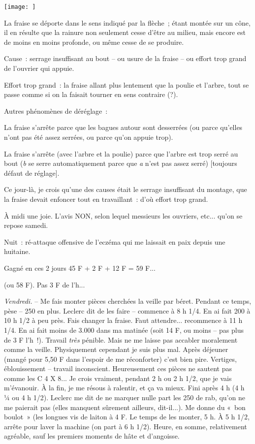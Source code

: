 \documentclass[french,twoside]{book} %
\begin{document}
\begin{center}
 \noindent\texttt{[image: ]} \end{center}
\noindent La fraise se déporte dans le sens indiqué par la flèche ; étant montée sur un cône, il en résulte que la rainure non seulement cesse d'être au milieu, mais encore est de moins en moins profonde, ou même cesse de se produire.\par
Cause : serrage insuffisant au bout – ou usure de la fraise – ou effort trop grand de l'ouvrier qui appuie.\par
Effort trop grand : la fraise allant plus lentement que la poulie et l'arbre, tout se passe comme si on la faisait tourner en sens contraire (?).\par
Autres phénomènes de déréglage :\par
La fraise s'arrête parce que les bagues autour sont desserrées (ou parce qu'elles n'ont pas été assez serrées, ou parce qu'on appuie trop).\par
La fraise s'arrête (avec l'arbre et la poulie) parce que l'arbre est trop serré au bout ({\itshape b} se serre automatiquement parce que {\itshape a} n'est pas assez serré) [toujours défaut de réglage].\par
Ce jour-là, je crois qu'une des causes était le serrage insuffisant du montage, que la fraise devait enfoncer tout en travaillant : d'où effort trop grand.\par
À midi une joie. L'avis NON, selon lequel messieurs les ouvriers, etc... qu'on se repose samedi.\par
Nuit : ré-attaque offensive de l'eczéma qui me laissait en paix depuis une huitaine.\par
Gagné en ces 2 jours 45 F + 2 F + 12 F = 59 F...\par
(ou 58 F). Pas 3 F de l'h...\par
{\itshape Vendredi.} – Me fais monter pièces cherchées la veille par béret. Pendant ce temps, pèse – 250 en plus. Leclerc dit de les faire – commence à 8 h 1/4. En ai fait 200 à 10 h 1/2 à peu près. Fais changer la fraise. Faut attendre... recommence à 11 h 1/4. En ai fait moins de 3.000 dans ma matinée (soit 14 F, ou moins – pas plus de 3 F l'h !). Travail {\itshape très} pénible. Mais ne me laisse pas accabler moralement comme la veille. Physiquement cependant je suis plus mal. Après déjeuner (mangé pour 5,50 F dans l'espoir de me réconforter) c'est bien pire. Vertiges, éblouissement – travail inconscient. Heureusement ces pièces ne sautent pas comme les C 4 X 8... Je crois vraiment, pendant 2 h ou 2 h 1/2, que je vais m'évanouir. À la fin, je me résous à ralentir, et ça va mieux. Fini après 4 h (4 h ¼ ou 4 h 1/2). Leclerc me dit de ne marquer nulle part les 250 de rab, qu'on ne me paierait pas (elles manquent sûrement ailleurs, dit-il...). Me donne du « bon boulot » (les longues vis de laiton à 4 F. Le temps de les monter, 5 h. À 5 h 1/2, arrête pour laver la machine (on part à 6 h 1/2). Heure, en somme, relativement agréable, sauf les premiers moments de hâte et d'angoisse.\par
\end{document}
